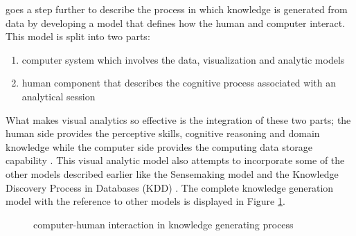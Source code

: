 \cite{sacha2014knowledge} goes a step further to describe the process in which knowledge is generated from data by developing a model that defines how the human and computer interact. 
This model is split into two parts: 
\begin{enumerate}
	\item computer system which involves the data, visualization and analytic models
	\item human component that describes the cognitive process  associated with an analytical session
\end{enumerate}
What makes visual analytics so effective is the integration of these two parts; the human side  provides the perceptive skills, cognitive reasoning and domain knowledge while the computer side provides the computing data storage capability \cite{sacha2014knowledge}. This visual analytic model also attempts to incorporate some of the other models described earlier like the Sensemaking model \cite{pirolli2005sensemaking} and the Knowledge Discovery Process in Databases (KDD) \cite{fayyad1996data}. The complete knowledge generation model with the reference to other models is displayed in Figure \ref{fig:5}.
\begin{figure}[!ht]
	\centering{}
	\caption{\cite{sacha2014knowledge} computer-human interaction in knowledge generating process}\label{fig:5}
\end{figure}


